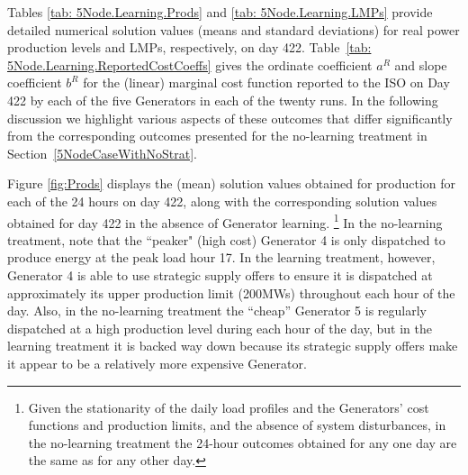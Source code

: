\documentclass[12pt]{article}
\begin{document}
Tables \ref{tab: 5Node.Learning.Prods} and \ref{tab: 5Node.Learning.LMPs} provide detailed numerical solution values (means and standard deviations) for real power production levels and LMPs, respectively, on day 422.  
Table~\ref{tab: 5Node.Learning.ReportedCostCoeffs} gives the ordinate coefficient $a^R$ and slope coefficient $b^R$ for the (linear) marginal cost function reported to the ISO on Day 422 by each of the five Generators in each of the twenty runs.  In the following discussion we highlight various aspects of these outcomes that differ significantly from the corresponding outcomes presented for the no-learning treatment in Section~\ref{5NodeCaseWithNoStrat}.

Figure \ref{fig:Prods} displays the (mean) solution values obtained for production for each of the 24 hours on day 422, along with the corresponding solution values obtained for day 422 in the absence of Generator learning.%
    \footnote{Given the stationarity of the daily load profiles and the Generators' cost functions and production limits, and the absence of system disturbances, in the no-learning treatment the 24-hour outcomes obtained for any one day are the same as for any other day.}   
     In the no-learning treatment, note that the ``peaker" (high cost) Generator 4 is only dispatched to produce energy at the peak load hour 17.  In the learning treatment, however, Generator 4 is able to use strategic supply offers to ensure it is dispatched at approximately its upper production limit (200MWs) throughout each hour of the day.  
Also, in the no-learning treatment the ``cheap'' Generator 5 is regularly dispatched at a high production level during each hour of the day, but in the learning treatment it is backed way down because its strategic supply offers make it appear to be a relatively more expensive Generator.  
\end{document}
